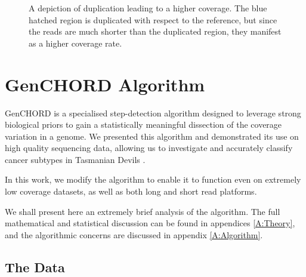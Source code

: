 \documentclass[fleqn,usenatbib]{mnras}
\begin{document}
\begin{figure}
\begin{center}
{
				}
			\end{center}\caption{A depiction of duplication leading to a higher coverage. The blue hatched region is duplicated with respect to the reference, but since the reads are much shorter than the duplicated region, they manifest as a higher coverage rate.}\label{Fig:Diagram}
		\end{figure}

		\section{GenCHORD Algorithm}

			GenCHORD is a specialised step-detection algorithm designed to leverage strong biological priors to gain a statistically meaningful dissection of the coverage variation in a genome. We presented this algorithm and demonstrated its use on high quality sequencing data, allowing us to investigate and accurately classify cancer subtypes in Tasmanian Devils \citep{GenCHORD1}.
			
			In this work, we modify the algorithm to enable it to function even on extremely low coverage datasets, as well as both long and short read platforms. 

			We shall present here an extremely brief analysis of the algorithm. The full mathematical and statistical discussion can be found in appendices \ref{A:Theory}, and the algorithmic concerns are discussed in appendix \ref{A:Algorithm}.
		
		
		\subsection{The Data}
\end{document}
